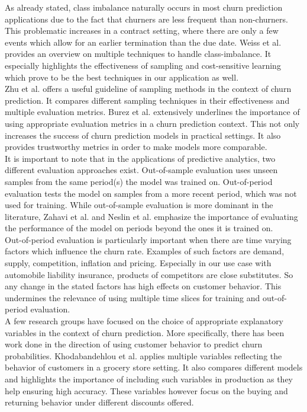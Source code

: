 \documentclass[12pt,titlepage]{article}
\begin{document}
As already stated, class imbalance naturally occurs in most churn prediction applications due to the fact that churners are less frequent than non-churners. This problematic increases in a contract setting, where there are only a few events which allow for an earlier termination than the due date. Weiss et al. \cite{mining_rarity} provides an overview on multiple techniques to handle class-imbalance. It especially highlights the effectiveness of sampling and cost-sensitive learning which prove to be the best techniques in our application as well. \\
Zhu et al. \cite{zhu} offers a useful guideline of sampling methods in the context of churn prediction. It compares different sampling techniques in their effectiveness and multiple evaluation metrics. Burez et al. \cite{burez} extensively underlines the importance of using appropriate evaluation metrics in a churn prediction context. This not only increases the success of churn prediction models in practical settings. It also provides trustworthy metrics in order to make models more comparable. \\
It is important to note that in the applications of predictive analytics, two different evaluation approaches exist. Out-of-sample evaluation uses unseen samples from the same period(s) the model was trained on. Out-of-period evaluation tests the model on samples from a more recent period, which was not used for training. While out-of-sample evaluation is more dominant in the literature, Zahavi et al. \cite{zahavi} and Neslin et al. \cite{neslin} emphasize the importance of evaluating the performance of the model on periods beyond the ones it is trained on. \\
Out-of-period evaluation is particularly important when there are time varying factors which influence the churn rate. Examples of such factors are demand, supply, competition, inflation and pricing. Especially in our use case with automobile liability insurance, products of competitors are close substitutes. So any change in the stated factors has high effects on customer behavior. This undermines the relevance of using multiple time slices for training and out-of-period evaluation. \\
A few research groups have focused on the choice of appropriate explanatory variables in the context of churn prediction. More specifically, there has been work done in the direction of using customer behavior to predict churn probabilities. Khodabandehlou et al. \cite{khodabandehlou} applies multiple variables reflecting the behavior of customers in a grocery store setting. It also compares different models and highlights the importance of including such variables in production as they help ensuring high accuracy. These variables however focus on the buying and returning behavior under different discounts offered. \\
\end{document}

